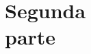 \cleardoublepage
\begingroup
\makeatletter
\let\ps@plain\ps@empty
\part[Segunda parte]{Segunda\\parte}
\endgroup
